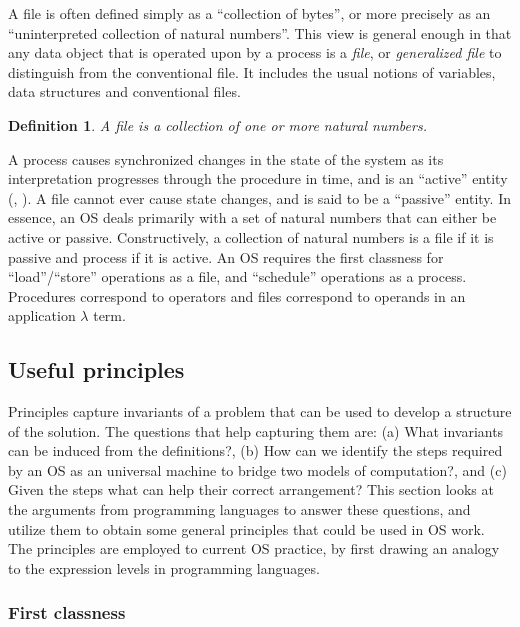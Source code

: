 \documentclass[draft]{article}
\newcounter{thedefn}
\newtheorem{mydefinition}[thedefn]{Definition}
\begin{document}
A file is  often defined simply as a ``collection  of bytes'', or more
precisely as an ``uninterpreted  collection of natural numbers''.  This
view is general  enough in that any data object  that is operated upon
by  a  process  is   a  \emph{file},  or  \emph{generalized  file}  to
distinguish from the conventional file.  It includes the usual notions
of variables, data structures and conventional files.


\begin{mydefinition}
  \label{def:file}
  A \emph{file} is a collection of one or more natural numbers.
\end{mydefinition}

A process  causes synchronized changes in  the state of  the system as
its interpretation progresses through the procedure in time, and is an
``active''        entity       (\cite{Denning:1971:TGC:356593.356595},
\cite{Holt:1972:DPC:850614.850627}).  A  file cannot ever  cause state
changes, and  is said to be  a ``passive'' entity.  In  essence, an OS
deals  primarily with  a set  of natural  numbers that  can  either be
active or passive.  Constructively, a collection of natural numbers is
a file if it  is passive and process if it is  active.  An OS requires
the first  classness for ``load''/``store'' operations as  a file, and
``schedule''  operations  as  a  process.   Procedures  correspond  to
operators and files correspond to operands in an application $\lambda$
term.

\subsection{Useful principles}
\label{sec:useful:principles}

Principles capture invariants of a problem that can be used to develop
a structure of  the solution.  The questions that  help capturing them
are: (a) What invariants can be induced from the definitions?, (b) How
can we identify the steps required by an OS as an universal machine to
bridge two  models of computation?, and  (c) Given the  steps what can
help their  correct arrangement?  This section looks  at the arguments
from programming languages to answer these questions, and utilize them
to obtain some general principles that  could be used in OS work.  The
principles are  employed to current  OS practice, by first  drawing an
analogy to the expression levels in programming languages.

\subsubsection{First classness}
\label{sec:first:classness}
\end{document}

